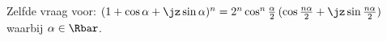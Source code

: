 Zelfde vraag voor: \((1+\cos{\alpha} + \jz \sin{\alpha} )^n = 2^n \cos^n{\frac{\alpha}{2}} \,(\cos{\frac {n\alpha }{2}} + \jz \sin{\frac{n\alpha }{2}})\) waarbij \(\alpha \in \Rbar \).
